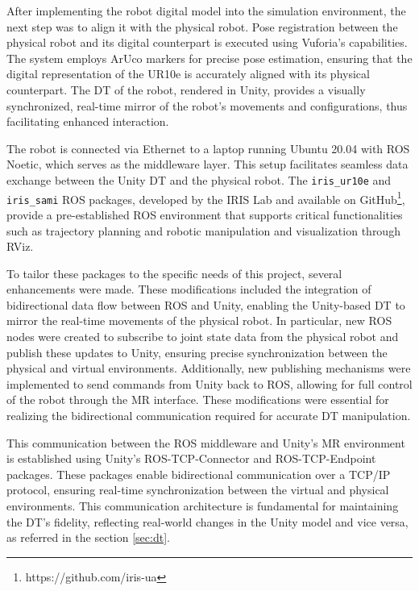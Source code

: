 After implementing the robot digital model into the simulation environment, the next step was to align it with the physical robot. Pose registration between the physical robot and its digital counterpart is executed using Vuforia's capabilities. The system employs ArUco markers for precise pose estimation, ensuring that the digital representation of the UR10e is accurately aligned with its physical counterpart. The \ac{DT} of the robot, rendered in Unity, provides a visually synchronized, real-time mirror of the robot's movements and configurations, thus facilitating enhanced interaction.

The robot is connected via Ethernet to a laptop running Ubuntu 20.04 with \ac{ROS} Noetic, which serves as the middleware layer. This setup facilitates seamless data exchange between the Unity \ac{DT} and the physical robot. The \texttt{iris\_ur10e} and \texttt{iris\_sami} \ac{ROS} packages, developed by the IRIS Lab and available on GitHub\footnote{https://github.com/iris-ua}, provide a pre-established \ac{ROS} environment that supports critical functionalities such as trajectory planning and robotic manipulation and visualization through RViz.

To tailor these packages to the specific needs of this project, several enhancements were made. These modifications included the integration of bidirectional data flow between \ac{ROS} and Unity, enabling the Unity-based \ac{DT} to mirror the real-time movements of the physical robot. In particular, new \ac{ROS} nodes were created to subscribe to joint state data from the physical robot and publish these updates to Unity, ensuring precise synchronization between the physical and virtual environments. Additionally, new publishing mechanisms were implemented to send commands from Unity back to \ac{ROS}, allowing for full control of the robot through the \ac{MR} interface. These modifications were essential for realizing the bidirectional communication required for accurate \ac{DT} manipulation.

This communication between the \ac{ROS} middleware and Unity’s \ac{MR} environment is established using Unity’s \ac{ROS}-\ac{TCP}-Connector and \ac{ROS}-\ac{TCP}-Endpoint packages. These packages enable bidirectional communication over a \ac{TCP}/\ac{IP} protocol, ensuring real-time synchronization between the virtual and physical environments. This communication architecture is fundamental for maintaining the \ac{DT}'s fidelity, reflecting real-world changes in the Unity model and vice versa, as referred in the section \ref{sec:dt}.

